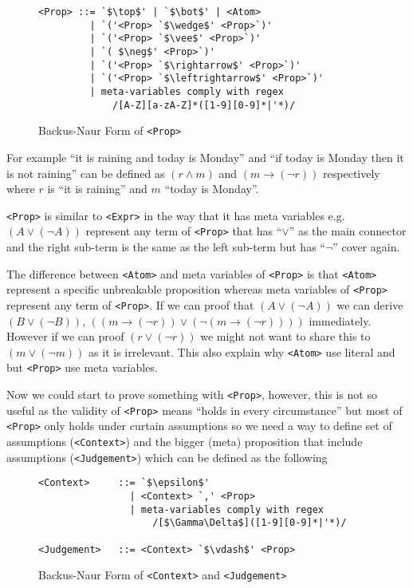 \documentclass[master.tex]{subfiles}
\begin{document}
\begin{figure}[H]
\begin{framed}
\begin{lstlisting}[style=bnf]
<Prop> ::= `$\top$' | `$\bot$' | <Atom>
         | `('<Prop> `$\wedge$' <Prop>`)'
         | `('<Prop> `$\vee$' <Prop>`)'
         | `( $\neg$' <Prop>`)'
         | `('<Prop> `$\rightarrow$' <Prop>`)'
         | `('<Prop> `$\leftrightarrow$' <Prop>`)'
         | meta-variables comply with regex
             /[A-Z][a-zA-Z]*([1-9][0-9]*|'*)/
\end{lstlisting}
\end{framed}
\caption{Backus-Naur Form of \texttt{<Prop>}}
\end{figure}

For example ``it is raining and today is Monday'' and ``if today is Monday then
it is not raining'' can be defined as $(r \wedge m)$ and $(m \rightarrow (\neg
r))$ respectively where $r$ is ``it is raining'' and $m$ ``today is Monday''.

\texttt{<Prop>} is similar to \texttt{<Expr>} in the way that it has meta
variables e.g. $(A \vee (\neg A))$ represent any term of \texttt{<Prop>} that
has ``$\vee$'' as the main connector and the right sub-term is the same as the
left sub-term but has ``$\neg$'' cover again.

The difference between \texttt{<Atom>} and meta variables of \texttt{<Prop>} is
that \texttt{<Atom>} represent a specific unbreakable proposition whereas meta
variables of \texttt{<Prop>} represent any term of \texttt{<Prop>}. If we can
proof that $(A \vee (\neg A))$ we can derive $(B \vee (\neg B))$, $((m
\rightarrow (\neg r)) \vee (\neg (m \rightarrow (\neg r))))$ immediately.
However if we can proof $(r \vee (\neg r))$ we might not want to share this to
$(m \vee (\neg m))$ as it is irrelevant. This also explain why \texttt{<Atom>}
use literal and but \texttt{<Prop>} use meta variables.

Now we could start to prove something with \texttt{<Prop>}, however, this is not
so useful as the validity of \texttt{<Prop>} means ``holds in every
circumstance'' but most of \texttt{<Prop>} only holds under curtain assumptions
so we need a way to define set of assumptions (\texttt{<Context>}) and the bigger
(meta) proposition that include assumptions (\texttt{<Judgement>}) which can be
defined as the following

\begin{figure}[H]
\begin{framed}
\begin{lstlisting}[style=bnf]
<Context>     ::= `$\epsilon$'
                | <Context> `,' <Prop>
                | meta-variables comply with regex
                    /[$\Gamma\Delta$]([1-9][0-9]*|'*)/

<Judgement>   ::= <Context> `$\vdash$' <Prop>
\end{lstlisting}
\end{framed}
\caption{Backus-Naur Form of \texttt{<Context>} and \texttt{<Judgement>}}
\end{figure}
\end{document}
